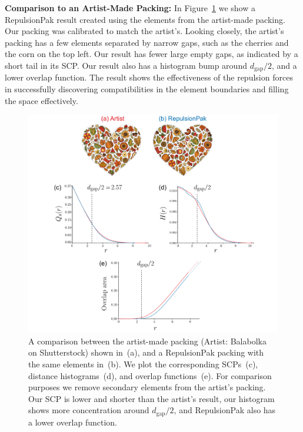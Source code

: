 \textbf{Comparison to an Artist-Made Packing:} 
In Figure~\ref{balabolka_comparison} we show a RepulsionPak result created 
using the elements from the artist-made packing.
Our packing was calibrated to match the artist's.
Looking closely, the artist's packing has a few elements 
separated by narrow gaps, such as the cherries and the corn on the top left.
Our result has fewer large empty gaps, as indicated by a short tail
in its SCP.
Our result also has a histogram bump around $d_\mathrm{gap}/2$, and a lower overlap function.
The result shows the effectiveness of the repulsion forces in successfully
discovering compatibilities in the element boundaries and filling the space effectively.

\begin{figure}
\centering
\includegraphics[width=1.0\textwidth]{figures/metrics/balabolka_comparison_big.pdf}
\caption[A comparison between the artist-made packing \newline  and a RepulsionPak packing]
{ \label{balabolka_comparison} 
A comparison between the artist-made packing (Artist: Balabolka on Shutterstock) shown in~(a), and a RepulsionPak packing
with the same elements in~(b).  We plot the corresponding SCPs~(c),
distance histograms~(d), and overlap functions~(e).
For comparison purposes we remove secondary elements from the artist's
packing.  Our SCP is lower and shorter than the artist's result,
our histogram shows more concentration around $d_\mathrm{gap} / 2$,
and RepulsionPak also has a lower overlap function.
}
\end{figure}

